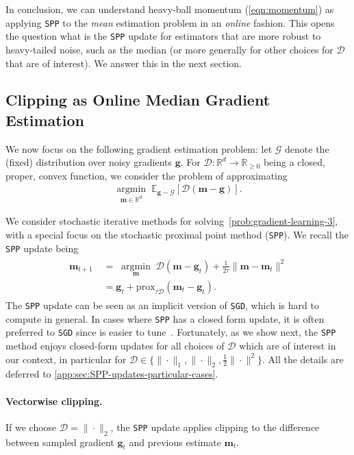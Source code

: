 \documentclass[10pt]{article} %
\renewcommand{\vec}[1]{\bm{#1}}
\DeclareMathOperator{\argmininn}{argmin}
\newcommand{\argmin}[1]{ \underset{#1}{\argmininn} \;}
\newcommand{\R}{\mathbb{R}}
\newcommand{\EE}[2]{\mathbb{E}_{#1}\left[#2\right] }
\newcommand{\prox}[1]{\mathrm{prox}_{#1}}
\newcommand{\dist}{\mathcal{D}}
\newcommand{\SGD}{\texttt{SGD}}
\newcommand{\SPP}{\texttt{SPP}}
\begin{document}
In conclusion, we can understand heavy-ball momentum (\ref{eqn:momentum}) as applying \SPP{} to the \emph{mean} estimation problem in an \emph{online} fashion. This opens the question what is the \SPP{} update for estimators that are more robust to heavy-tailed noise, such as the median (or more generally for other choices for $\dist$ that are of interest).
We answer this in the next section.
%
%
\subsection{Clipping as Online Median Gradient Estimation}\label{sec:grad-estimation-with-spp}

We now focus on the following gradient estimation problem:
let $\mathcal{G}$ denote the (fixed) distribution over noisy gradients $\vec{g}$. For $\dist:\R^d \to \R_{\geq 0}$ being a closed, proper, convex function, we consider the problem of approximating \begin{align}\label{prob:gradient-learning-3}
    \argmin{\vec{m} \in \R^d} \EE{\vec{g}\sim \mathcal{G}} 
   { \dist(\vec{m}-\vec{g})}.
\end{align}

We consider stochastic iterative methods for solving~\eqref{prob:gradient-learning-3}, with a special focus on the stochastic proximal point method (\SPP{}). We recall the \SPP{} update being
\begin{align}\label{eqn:online-spp-update}
    \begin{split}
    \vec{m}_{t+1} \; &= \; \argmin{\vec{m}} \dist(\vec{m}-\vec{g}_t) +\frac{1}{2\tau}\|\vec{m}-\vec{m}_t\|^2 \\
    &= \vec{g}_t + \prox{\tau \dist}(\vec{m}_t -\vec{g}_t).
    \end{split}
\end{align}
The \SPP{} update can be seen as an implicit version of \SGD{}, which is hard to compute in general. In cases where \SPP{} has a closed form update, it is often preferred to \SGD{} since is easier to tune~\citep{Asi2019,Milzarek2024}.
Fortunately, as we show next, the \SPP{} method enjoys closed-form updates for all choices of $\dist$ which are of interest in our context, in particular for $\dist \in \{\|\cdot\|_1,\|\cdot\|_2,\tfrac12\|\cdot\|^2\}$. All the details are deferred to \cref{app:sec:SPP-updates-particular-cases}.

\paragraph{Vectorwise clipping.} 
If we choose $\dist = \|\cdot\|_2$, the \SPP{} update applies clipping to the difference between sampled gradient $\vec{g}_t$ and previous estimate $\vec{m}_t$. 
\end{document}
